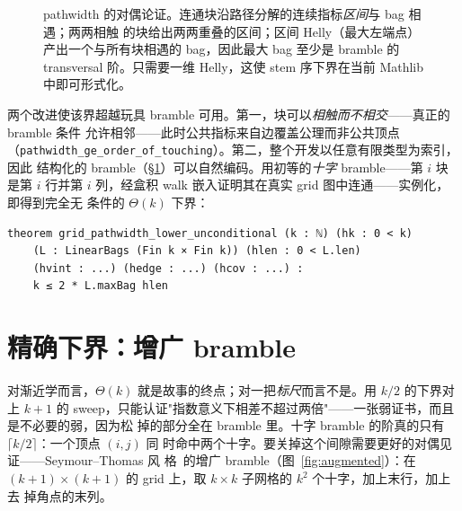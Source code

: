 \documentclass[11pt]{ctexart}
\begin{document}
\begin{figure}[t]
\centering
{}
\caption{pathwidth 的对偶论证。连通块沿路径分解的连续指标\emph{区间}与 bag 相遇；两两相触
的块给出两两重叠的区间；区间 Helly（最大左端点）产出一个与所有块相遇的 bag，因此最大 bag
至少是 bramble 的 transversal 阶。只需要一维 Helly，这使 stem 序下界在当前 Mathlib 中即可形式化。}
\label{fig:helly}
\end{figure}

两个改进使该界超越玩具 bramble 可用。第一，块可以\emph{相触而不相交}——真正的 bramble 条件
允许相邻——此时公共指标来自边覆盖公理而非公共顶点
（\texttt{pathwidth\_ge\_order\_of\_touching}）。第二，整个开发以任意有限类型为索引，因此
结构化的 bramble（\S\ref{sec:exact}）可以自然编码。用初等的\emph{十字} bramble——第 $i$ 块
是第 $i$ 行并第 $i$ 列，经盒积 walk 嵌入证明其在真实 grid 图中连通——实例化，即得到完全无
条件的 $\Theta(k)$ 下界：

\begin{lstlisting}
theorem grid_pathwidth_lower_unconditional (k : ℕ) (hk : 0 < k)
    (L : LinearBags (Fin k × Fin k)) (hlen : 0 < L.len)
    (hvint : ...) (hedge : ...) (hcov : ...) :
    k ≤ 2 * L.maxBag hlen
\end{lstlisting}

\section{精确下界：增广 bramble}\label{sec:exact}

对渐近学而言，$\Theta(k)$ 就是故事的终点；对一把\emph{标尺}而言不是。用 $k/2$ 的下界对上
$k+1$ 的 sweep，只能认证"指数意义下相差不超过两倍"——一张弱证书，而且是不必要的弱，因为松
掉的部分全在 bramble 里。十字 bramble 的阶真的只有 $\lceil k/2\rceil$：一个顶点 $(i,j)$ 同
时命中两个十字。要关掉这个间隙需要更好的对偶见证——Seymour--Thomas 风
格~\cite{seymour1993graph}的增广 bramble（图~\ref{fig:augmented}）：在
$(k{+}1)\times(k{+}1)$ 的 grid 上，取 $k\times k$ 子网格的 $k^2$ 个十字，加上末行，加上去
掉角点的末列。
\end{document}
